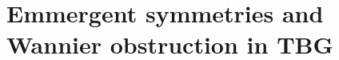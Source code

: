 



\chapter{Emmergent symmetries and Wannier obstruction in TBG} \label{ch:emmergent_symm_wannier_obstruction}

%
%
%
%

